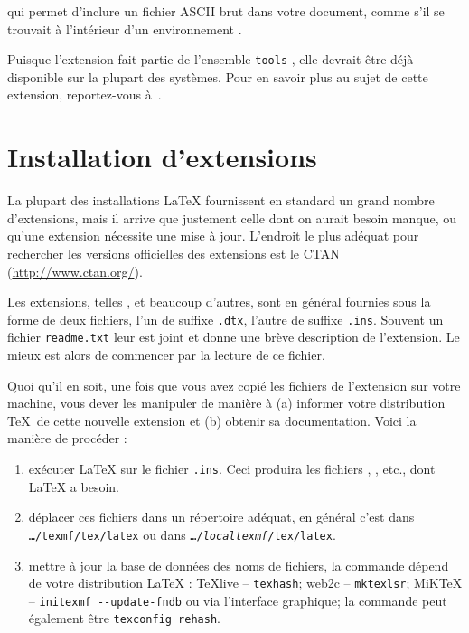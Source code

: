 \noindent qui permet d'inclure un fichier ASCII brut dans votre
document, comme s'il se trouvait à l'intérieur d'un environnement
.

Puisque l'extension  fait partie de l'ensemble \og
\texttt{tools} \fg{}, elle devrait être déjà disponible sur la plupart
des systèmes. Pour en savoir plus au sujet de cette extension,
reportez-vous à~\cite{verbatim}.

\section{Installation d'extensions}
\label{sec:Packages}

La plupart des  installations \LaTeX{} fournissent en standard un grand
nombre d'extensions, mais il arrive que justement celle dont on aurait
besoin manque, ou qu'une extension nécessite une mise à jour.
L'endroit le plus adéquat pour rechercher les versions officielles
des  extensions est le CTAN (\url{http://www.ctan.org/}).

Les extensions, telles ,  et beaucoup
d'autres, sont en général fournies sous la forme de deux fichiers, l'un
de suffixe \texttt{.dtx}, l'autre de suffixe \texttt{.ins}.  Souvent
un fichier \texttt{readme.txt} leur est joint et donne une brève
description de l'extension. Le mieux est alors de commencer par la
lecture de ce fichier.

Quoi qu'il en soit, une fois que vous avez copié les fichiers de
l'extension sur votre machine, vous dever les manipuler de manière à
(a) informer votre distribution \TeX\ de cette nouvelle extension et
(b) obtenir sa documentation. Voici la manière de procéder :

\begin{enumerate}
\item exécuter \LaTeX{} sur le fichier \texttt{.ins}. Ceci produira les
  fichiers , , etc., dont \LaTeX{} a besoin.
\item déplacer ces fichiers dans un répertoire adéquat, en général
  c'est dans \texttt{\ldots/texmf/tex/latex} ou dans
  \texttt{\ldots/\emph{localtexmf}/tex/latex}.
\item mettre à jour la base de données des noms de fichiers, la commande
  dépend de votre distribution \LaTeX{} :
  \TeX{}live -- \texttt{texhash}; web2c -- \texttt{mktexlsr};
  MiK\TeX{} -- \texttt{initexmf -{}-update-fndb} ou via l'interface
  graphique; la commande peut également être \texttt{texconfig rehash}.
\end{enumerate}

